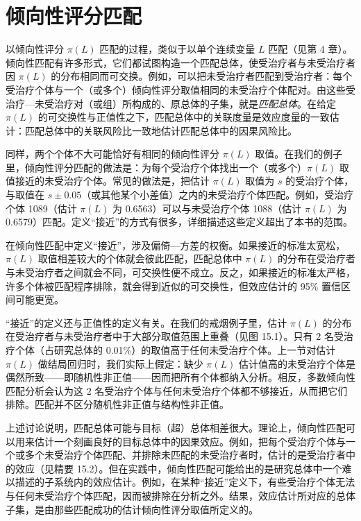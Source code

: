 \section{倾向性评分匹配}

以倾向性评分 $\pi(L)$ 匹配的过程，类似于以单个连续变量 $L$ 匹配（见第 4 章）。倾向性匹配有许多形式，它们都试图构造一个匹配总体，使受治疗者与未受治疗者因 $\pi(L)$ 的分布相同而可交换。例如，可以把未受治疗者匹配到受治疗者：每个受治疗个体与一个（或多个）倾向性评分取值相同的未受治疗个体配对。由这些受治疗—未受治疗对（或组）所构成的、原总体的子集，就是\emph{匹配总体}。在给定 $\pi(L)$ 的可交换性与正值性之下，匹配总体中的关联度量是效应度量的一致估计：匹配总体中的关联风险比一致地估计匹配总体中的因果风险比。

同样，两个个体不大可能恰好有相同的倾向性评分 $\pi(L)$ 取值。在我们的例子里，倾向性评分匹配的做法是：为每个受治疗个体找出一个（或多个）$\pi(L)$ 取值接近的未受治疗个体。常见的做法是，把估计 $\pi(L)$ 取值为 $s$ 的受治疗个体，与取值在 $s\pm 0.05$（或其他某个小差值）之内的未受治疗个体匹配。例如，受治疗个体 1089（估计 $\pi(L)$ 为 0.6563）可以与未受治疗个体 1088（估计 $\pi(L)$ 为 0.6579）匹配。定义“接近”的方式有很多，详细描述这些定义超出了本书的范围。

在倾向性匹配中定义“接近”，涉及偏倚—方差的权衡。如果接近的标准太宽松，$\pi(L)$ 取值相差较大的个体就会彼此匹配，匹配总体中 $\pi(L)$ 的分布在受治疗者与未受治疗者之间就会不同，可交换性便不成立。反之，如果接近的标准太严格，许多个体被匹配程序排除，就会得到近似的可交换性，但效应估计的 95\% 置信区间可能更宽。

“接近”的定义还与正值性的定义有关。在我们的戒烟例子里，估计 $\pi(L)$ 的分布在受治疗者与未受治疗者中于大部分取值范围上重叠（见图 15.1）。只有 2 名受治疗个体（占研究总体的 0.01\%）的取值高于任何未受治疗个体。上一节对估计 $\pi(L)$ 做结局回归时，我们实际上假定：缺少 $\pi(L)$ 估计值高的未受治疗个体是偶然所致——即随机性非正值——因而把所有个体都纳入分析。相反，多数倾向性匹配分析会认为这 2 名受治疗个体与任何未受治疗个体都不够接近，从而把它们排除。匹配并不区分随机性非正值与结构性非正值。

上述讨论说明，匹配总体可能与目标（超）总体相差很大。理论上，倾向性匹配可以用来估计一个刻画良好的目标总体中的因果效应。例如，把每个受治疗个体与一个或多个未受治疗个体匹配、并排除未匹配的未受治疗者时，估计的是受治疗者中的效应（见精要 15.2）。但在实践中，倾向性匹配可能给出的是研究总体中一个难以描述的子系统内的效应估计。例如，在某种“接近”定义下，有些受治疗个体无法与任何未受治疗个体匹配，因而被排除在分析之外。结果，效应估计所对应的总体子集，是由那些匹配成功的估计倾向性评分取值所定义的。

